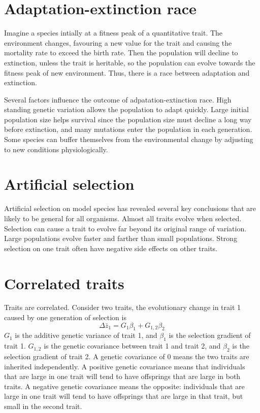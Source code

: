 \documentclass[11pt]{article}
\begin{document}
\begin{sloppypar}
\section{Adaptation-extinction race}
Imagine a species intially at a fitness peak of a quantitative trait. 
The environment changes, favouring a new value for the trait and causing the mortality rate to exceed the birth rate. 
Then the population will decline to extinction, unless the trait is heritable, so the population can evolve towards the fitness peak of new environment. 
Thus, there is a race between adaptation and extinction. 

\par

Several factors influence the outcome of adpatation-extinction race. 
High standing genetic variation allows the population to adapt quickly. 
Large initial population size helps survival since the population size must decline a long way before extinction, and many mutations enter the population in each generation. 
Some species can buffer themselves from the environmental change by adjusting to new conditions physiologically. 

\section{Artificial selection}
Artificial selection on model species has revealed several key conclusions that are likely to be general for all organisms. 
Almost all traits evolve when selected. 
Selection can cause a trait to evolve far beyond its original range of variation. 
Large populations evolve faster and farther than small populations. 
Strong selection on one trait often have negative side effects on other traits. 

\section{Correlated traits}
Traits are correlated. 
Consider two traits, the evolutionary change in trait 1 caused by one generation of selection is 
\begin{equation}
  \Delta \bar{z}_1 = G_1 \beta_1 + G_{1,2} \beta_2
\end{equation}
$G_1$ is the additive genetic variance of trait 1, and $\beta_1$ is the selection gradient of trait 1. 
$G_{1,2}$ is the genetic covariance between trait 1 and trait 2, and $\beta_2$ is the selection gradient of trait 2. 
A genetic covariance of 0 means the two traits are inherited independently. 
A positive genetic covariance means that individuals that are large in one trait will tend to have offsprings that are large in both traits. 
A negative genetic covariance means the opposite: individuals that are large in one trait will tend to have offsprings that are large in that trait, but small in the second trait. 


\end{sloppypar}
\end{document}
